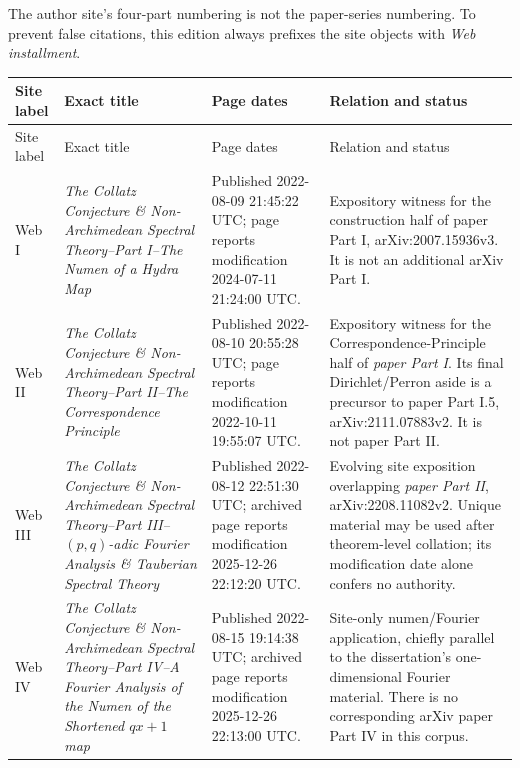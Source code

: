 The author site's four-part numbering is not the paper-series numbering.  To
prevent false citations, this edition always prefixes the site objects with
\emph{Web installment}.

\begingroup\small
\setlength{\tabcolsep}{3pt}
\begin{longtable}{@{}p{}p{}p{}p{}@{}}
\toprule
Site label & Exact title & Page dates & Relation and status\\
\midrule
\endfirsthead
\toprule
Site label & Exact title & Page dates & Relation and status\\
\midrule
\endhead
Web I & \emph{The Collatz Conjecture \& Non-Archimedean Spectral Theory--Part I--The Numen of a Hydra Map}
& Published 2022-08-09 21:45:22 UTC; page reports modification 2024-07-11 21:24:00 UTC.
& Expository witness for the construction half of paper Part I, arXiv:2007.15936v3.  It is not an additional arXiv Part I.\\

Web II & \emph{The Collatz Conjecture \& Non-Archimedean Spectral Theory--Part II--The Correspondence Principle}
& Published 2022-08-10 20:55:28 UTC; page reports modification 2022-10-11 19:55:07 UTC.
& Expository witness for the Correspondence-Principle half of \emph{paper Part I}.  Its final Dirichlet/Perron aside is a precursor to paper Part I.5, arXiv:2111.07883v2.  It is not paper Part II.\\

Web III & \emph{The Collatz Conjecture \& Non-Archimedean Spectral Theory--Part III--$(p,q)$-adic Fourier Analysis \& Tauberian Spectral Theory}
& Published 2022-08-12 22:51:30 UTC; archived page reports modification 2025-12-26 22:12:20 UTC.
& Evolving site exposition overlapping \emph{paper Part II}, arXiv:2208.11082v2.  Unique material may be used after theorem-level collation; its modification date alone confers no authority.\\

Web IV & \emph{The Collatz Conjecture \& Non-Archimedean Spectral Theory--Part IV--A Fourier Analysis of the Numen of the Shortened $qx+1$ map}
& Published 2022-08-15 19:14:38 UTC; archived page reports modification 2025-12-26 22:13:00 UTC.
& Site-only numen/Fourier application, chiefly parallel to the dissertation's one-dimensional Fourier material.  There is no corresponding arXiv paper Part IV in this corpus.\\
\bottomrule
\end{longtable}
\endgroup

